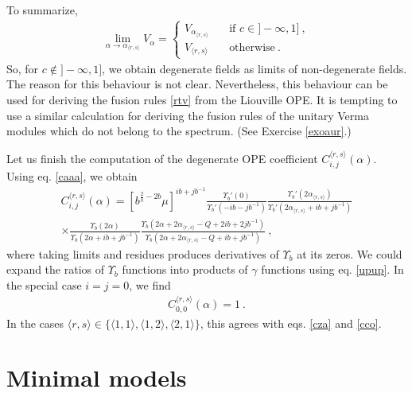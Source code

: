 \documentclass[12pt, a4paper, notitlepage, twoside]{report}
\numberwithin{equation}{section}
\theoremstyle{break}
\begin{document}
To summarize, 
\begin{align}
 \boxed{
 \underset{\alpha\to \alpha_{\langle r,s \rangle}}{\lim } V_\alpha = 
 \left\{ \begin{array}{ll}
          V_{\alpha_{\langle r,s \rangle}} \quad & \text{if\ } c\in ]-\infty, 1]\ ,
          \\
          V_{\langle r,s \rangle} & \text{otherwise}\ .
         \end{array}\right. 
         }
\label{vla}
\end{align}
So, for $c\notin ]-\infty, 1]$, we obtain degenerate fields as limits of non-degenerate fields. 
The reason for this behaviour is not clear.
Nevertheless, this behaviour can be used for deriving the fusion rules \eqref{rtv} from the Liouville OPE. 
It is tempting to use a similar calculation for deriving the fusion rules of the unitary Verma modules which do not belong to the spectrum. 
(See Exercise \ref{exoaur}.)

Let us finish the computation of the degenerate OPE coefficient $C_{i,j}^{\langle r,s \rangle}(\alpha)$.
Using eq. \eqref{caaa}, we obtain 
\begin{multline}
 C_{i,j}^{\langle r,s \rangle}(\alpha) = \left[b^{\frac{2}{b}-2b}\mu\right]^{ib+jb^{-1}} \frac{\Upsilon_b'(0)}{\Upsilon_b'(-ib-jb^{-1})} \frac{\Upsilon_b'(2\alpha_{\langle r,s \rangle})}{\Upsilon_b'(2\alpha_{\langle r,s \rangle}+ib+jb^{-1})}
\\ \times
 \frac{\Upsilon_b(2\alpha)}{\Upsilon_b(2\alpha+ib+jb^{-1})} \frac{\Upsilon_b(2\alpha+2\alpha_{\langle r,s \rangle}-Q+2ib+2jb^{-1})}{\Upsilon_b(2\alpha+2\alpha_{\langle r,s \rangle}-Q+ib+jb^{-1})} \ ,
\end{multline}
where taking limits and residues produces derivatives of $\Upsilon_b$ at its zeros.
We could expand the ratios of $\Upsilon_b$ functions into products of $\gamma$ functions using eq. \eqref{upup}.
In the special case $i=j=0$, we find
\begin{align}
 C_{0,0}^{\langle r,s \rangle}(\alpha) = 1 \ .
\end{align}
In the cases $\langle r,s \rangle \in \{\langle 1,1 \rangle , \langle 1,2 \rangle, \langle 2,1 \rangle\}$, 
this agrees with eqs. \eqref{cza} and \eqref{cco}.  



\section{Minimal models \label{secvmm}}
\end{document}
